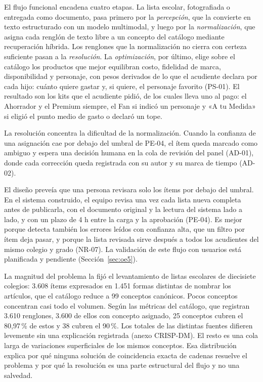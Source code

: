 El flujo funcional encadena cuatro etapas. La lista escolar, fotografiada o entregada como
documento, pasa primero por la \emph{percepción}, que la convierte en texto estructurado
con un modelo multimodal, y luego por la \emph{normalización}, que asigna cada renglón de
texto libre a un concepto del catálogo mediante recuperación híbrida. Los renglones que la
normalización no cierra con certeza suficiente pasan a la \emph{resolución}. La
\emph{optimización}, por último, elige sobre el catálogo los productos que mejor equilibran
costo, fidelidad de marca, disponibilidad y personaje, con pesos derivados de lo que el
acudiente declara por cada hijo: cuánto quiere gastar y, si quiere, el personaje favorito
(PS-01). El resultado son los kits que el acudiente pidió, de los cuales lleva uno al pago:
el Ahorrador y el Premium siempre, el Fan si indicó un personaje y «A tu Medida» si eligió el
punto medio de gasto o declaró un tope.

La resolución concentra la dificultad de la normalización. Cuando la confianza de una
asignación cae por debajo del umbral de PE-04, el ítem queda marcado como ambiguo y espera
una decisión humana en la cola de revisión del panel (AD-01), donde cada corrección queda
registrada con su autor y su marca de tiempo (AD-02).

El
diseño preveía que una persona revisara solo los ítems por debajo del umbral. En el sistema
construido, el equipo revisa una vez cada lista nueva completa antes de publicarla, con el
documento original y la lectura del sistema lado a lado, y con un plazo de 4 h entre la
carga y la aprobación (PE-04). Es mejor porque detecta también los errores leídos con
confianza alta, que un filtro por ítem deja pasar, y porque la lista revisada sirve después a
todos los acudientes del mismo colegio y grado (NR-07). La validación de este flujo con
usuarios está planificada y pendiente (Sección~\ref{sec:oe5}).

La magnitud del problema la fijó el levantamiento de listas escolares de diecisiete
colegios: 3.608 ítems expresados en 1.451 formas distintas de nombrar los artículos, que el
catálogo reduce a 99 conceptos canónicos. Pocos conceptos concentran casi todo el volumen.
Según las métricas del catálogo, que registran 3.610 renglones, 3.600 de ellos con concepto
asignado, 25 conceptos cubren el 80,97\,\% de estos y 38 cubren el 90\,\%. Los totales de las
distintas fuentes difieren levemente sin una explicación registrada (anexo CRISP-DM). El
resto es una cola larga de variaciones superficiales de los mismos conceptos. Esa
distribución explica por qué ninguna solución de coincidencia exacta de cadenas resuelve el
problema y por qué la resolución es una parte estructural del flujo y no una salvedad.
